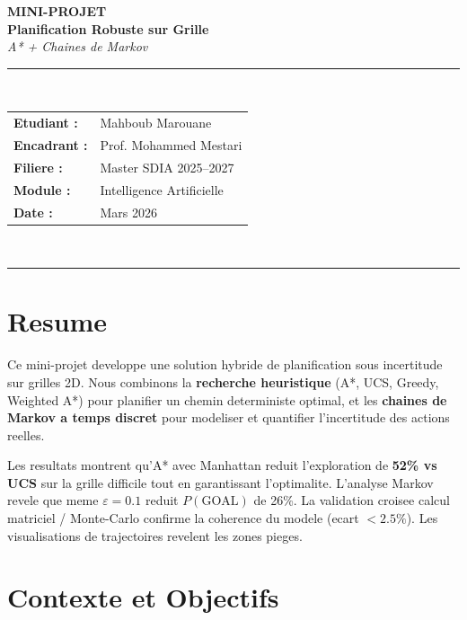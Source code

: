 \documentclass[11pt,a4paper]{article}
\begin{document}
\begin{center}
  \vspace*{0.4cm}
  {\LARGE\bfseries\color{bleufonce} MINI-PROJET}\\[0.25cm]
  {\Large\bfseries\color{bleu} Planification Robuste sur Grille}\\[0.12cm]
  {\large\itshape\color{gray} A* + Chaines de Markov}\\[0.4cm]
  {\color{bleu}\rule{0.8\linewidth}{1pt}}\\[0.35cm]
  \begin{tabular}{ll}
    \textbf{Etudiant :}  & Mahboub Marouane \\[3pt]
    \textbf{Encadrant :} & Prof. Mohammed Mestari \\[3pt]
    \textbf{Filiere :}   & Master SDIA 2025--2027 \\[3pt]
    \textbf{Module :}    & Intelligence Artificielle \\[3pt]
    \textbf{Date :}      & Mars 2026 \\
  \end{tabular}\\[0.35cm]
  {\color{bleu}\rule{0.8\linewidth}{1pt}}
\end{center}
\vspace{0.2cm}

\section{Resume}

Ce mini-projet developpe une solution hybride de planification sous incertitude sur grilles 2D.
Nous combinons la \textbf{recherche heuristique} (A*, UCS, Greedy, Weighted A*) pour planifier
un chemin deterministe optimal, et les \textbf{chaines de Markov a temps discret} pour modeliser
et quantifier l'incertitude des actions reelles.

Les resultats montrent qu'A* avec Manhattan reduit l'exploration de \textbf{52\% vs UCS} sur la
grille difficile tout en garantissant l'optimalite. L'analyse Markov revele que meme $\varepsilon=0.1$
reduit $P(\text{GOAL})$ de 26\%. La validation croisee calcul matriciel / Monte-Carlo confirme la
coherence du modele (ecart $<2.5\%$). Les visualisations de trajectoires revelent les zones pieges.

\section{Contexte et Objectifs}
\end{document}
